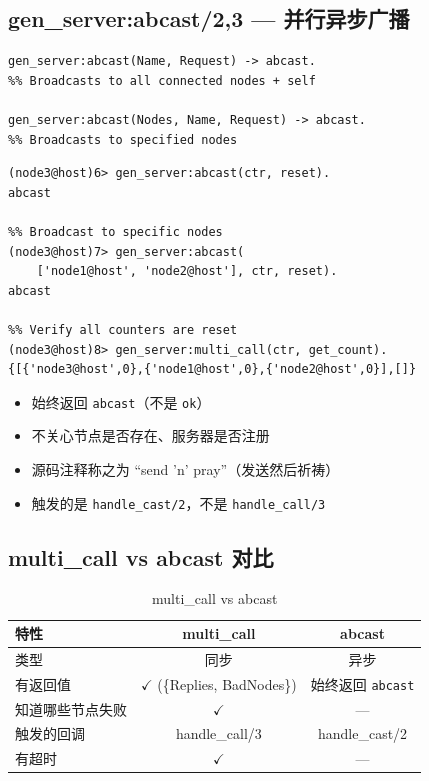 \documentclass[a4paper,11pt]{article}
\begin{document}
\subsection{gen\_server:abcast/2,3 --- 并行异步广播}

\begin{lstlisting}[style=erlangstyle, caption={abcast 函数签名}]
gen_server:abcast(Name, Request) -> abcast.
%% Broadcasts to all connected nodes + self

gen_server:abcast(Nodes, Name, Request) -> abcast.
%% Broadcasts to specified nodes
\end{lstlisting}

\begin{lstlisting}[style=shellstyle, caption={abcast 演示}]
%% Broadcast reset to all nodes
(node3@host)6> gen_server:abcast(ctr, reset).
abcast

%% Broadcast to specific nodes
(node3@host)7> gen_server:abcast(
    ['node1@host', 'node2@host'], ctr, reset).
abcast

%% Verify all counters are reset
(node3@host)8> gen_server:multi_call(ctr, get_count).
{[{'node3@host',0},{'node1@host',0},{'node2@host',0}],[]}
\end{lstlisting}

\begin{notebox}
\begin{itemize}[leftmargin=1.5em]
    \item 始终返回 \texttt{abcast}（不是 \texttt{ok}）
    \item 不关心节点是否存在、服务器是否注册
    \item 源码注释称之为 ``send 'n' pray''（发送然后祈祷）
    \item 触发的是 \texttt{handle\_cast/2}，不是 \texttt{handle\_call/3}
\end{itemize}
\end{notebox}

\subsection{multi\_call vs abcast 对比}

\begin{table}[H]
\centering
\begin{tabular}{@{}lcc@{}}
\toprule
\textbf{特性} & \textbf{multi\_call} & \textbf{abcast} \\
\midrule
类型 & 同步 & 异步 \\
有返回值 & $\checkmark$ (\{Replies, BadNodes\}) & 始终返回 \texttt{abcast} \\
知道哪些节点失败 & $\checkmark$ & --- \\
触发的回调 & handle\_call/3 & handle\_cast/2 \\
有超时 & $\checkmark$ & --- \\
\bottomrule
\end{tabular}
\caption{multi\_call vs abcast}
\end{table}
\end{document}
